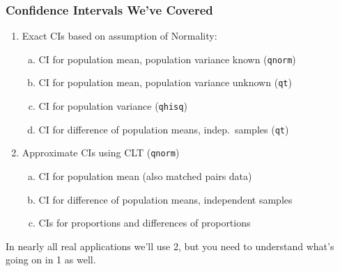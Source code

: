 \documentclass[handout]{beamer}
\begin{document}
\begin{frame}
	\frametitle{Confidence Intervals We've Covered}
	\begin{enumerate}
		\item Exact CIs based on assumption of Normality:
			\begin{enumerate}[(a)]
				\item CI for population mean, population variance known (\texttt{qnorm})
				\item CI for population mean, population variance unknown (\texttt{qt})
				\item CI for population variance (\texttt{qhisq})
				\item CI for difference of population means, indep.\ samples (\texttt{qt})
			\end{enumerate}
			\vspace{0.1in}
		\item Approximate CIs using CLT (\texttt{qnorm})
			\begin{enumerate}[(a)]
				\item CI for population mean (also matched pairs data)
				\item CI for difference of population means, independent samples
				\item CIs for proportions and differences of proportions 
			\end{enumerate}
	\end{enumerate}
  \alert{In nearly all real applications we'll use 2, but you need to understand what's going on in 1 as well.}
\end{frame}
\end{document}
